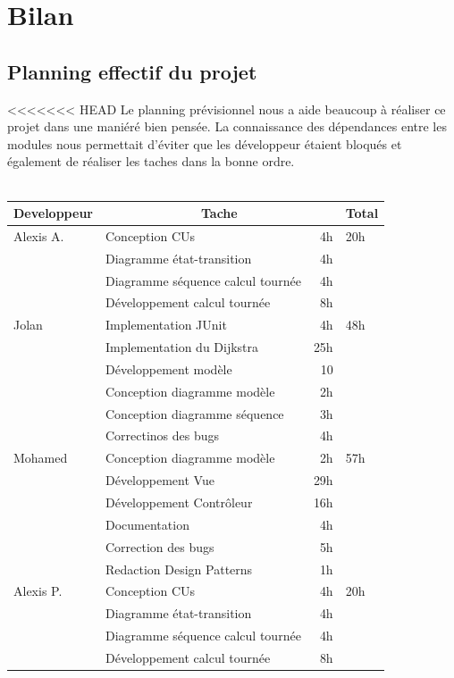 \documentclass[10pt,a4paper]{book}
\begin{document}
\chapter{Bilan}
\section{Planning effectif du projet}
<<<<<<< HEAD
Le planning prévisionnel nous a aide beaucoup à réaliser ce projet dans une maniéré bien pensée. La connaissance des dépendances entre les modules nous permettait d'éviter que les développeur étaient bloqués et également de réaliser les taches dans la bonne ordre.\\\\
\begin{longtable}{|l|l|r|l|}
\hline
\textbf{Developpeur}&\multicolumn{2}{c|}{\textbf{Tache}}&\textbf{Total}\\
\hline

\hline
Alexis A. & Conception CUs & 4h & 20h\\
\cline{2-3}
& Diagramme état-transition & 4h & ~\\
\cline{2-3}
& Diagramme séquence calcul tournée & 4h & ~\\
\cline{2-3}
& Développement calcul tournée & 8h & ~\\
\hline

\hline
Jolan & Implementation JUnit & 4h & 48h\\
\cline{2-3}
& Implementation du Dijkstra & 25h & ~\\
\cline{2-3}
& Développement modèle & 10 & ~\\
\cline{2-3}
& Conception diagramme modèle & 2h & ~\\
\cline{2-3}
& Conception diagramme séquence & 3h & ~\\
\cline{2-3}
& Correctinos des bugs & 4h & ~\\
\hline

\hline
Mohamed & Conception diagramme modèle & 2h & 57h\\
\cline{2-3}
& Développement Vue & 29h & ~\\
\cline{2-3}
& Développement Contrôleur & 16h & ~\\
\cline{2-3}
& Documentation & 4h & ~\\
\cline{2-3}
& Correction des bugs & 5h & ~\\
\cline{2-3}
& Redaction Design Patterns & 1h & ~\\
\hline

\hline
Alexis P. & Conception CUs & 4h & 20h\\
\cline{2-3}
& Diagramme état-transition & 4h & ~\\
\cline{2-3}
& Diagramme séquence calcul tournée & 4h & ~\\
\cline{2-3}
& Développement calcul tournée & 8h & ~\\
\hline


\end{longtable}
\end{document}
